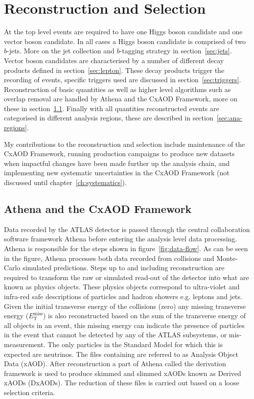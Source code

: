 \chapter{Reconstruction and Selection}%
\label{ch:recon}

At the top level events are required to have one Higgs boson candidate and one
vector boson candidate. In all cases a Higgs boson candidate is comprised of two
$b$-jets. More on the jet collection and $b$-tagging strategy in
section~\ref{sec:jets}. Vector boson candidates are characterised by a number of
different decay products defined in section~\ref{sec:lepton}. These decay
products trigger the recording of events, specific triggers used are discussed
in section~\ref{sec:triggers}. Reconstruction of basic quantities as well as
higher level algorithms such as overlap removal are handled by Athena and the
CxAOD Framework, more on these in section~\ref{sec:cxaod}. Finally with all
quantities reconstructed events are categorised in different analysis regions,
these are described in section~\ref{sec:ana-regions}.

My contributions to the reconstruction and selection include maintenance of the
CxAOD Framework, running production campaigns to produce new datasets when
impactful changes have been made further up the analysis chain, and implementing
new systematic uncertainties in the CxAOD Framework (not discussed until
chapter~\ref{ch:systematics}).

\section{Athena and the CxAOD Framework}
\label{sec:cxaod} Data recorded by the ATLAS detector is passed through the
central collaboration software framework Athena before entering the analysis
level data processing. 
Athena is responsible for the steps shown in figure~\ref{fig:data-flow}. As can
be seen in the figure, Athena processes both data recorded from collisions and
Monte-Carlo simulated predictions. Steps up to and including reconstruction are
required to transform the raw or simulated read-out of the detector into what
are known as physics objects. These physics objects correspond to ultra-violet
and infra-red safe descriptions of particles and hadron showers e.g. leptons and
jets. Given the initial transverse energy of the collisions (zero) any missing
transverse energy ($E_{\mathrm{T}}^{\text{miss}}$) is also reconstructed based
on the sum of the transverse energy of all objects in an event, this missing
energy can indicate the presence of particles in the event that cannot be
detected by any of the ATLAS subsystems, or mis-measurement. The only particles
in the Standard Model for which this is expected are neutrinos. The files
containing are referred to as Analysis Object Data (xAOD). After reconstruction a
part of Athena called the derivation framework is used to produce skimmed and
slimmed xAODs known as Derived xAODs (DxAODs). The reduction of these files is
carried out based on a loose selection criteria.

